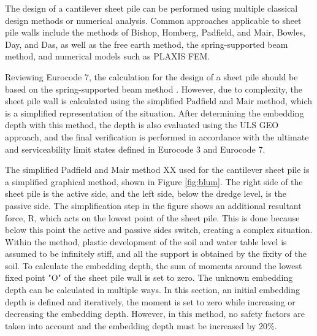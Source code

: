 The design of a cantilever sheet pile can be performed using multiple classical design methods or numerical analysis. Common approaches applicable to sheet pile walls include the methods of Bishop, Homberg, Padfield, and Mair, Bowles, Day, and Das, as well as the free earth method, the spring-supported beam method, and numerical models such as PLAXIS FEM.

Reviewing Eurocode 7, the calculation for the design of a sheet pile should be based on the spring-supported beam method \autocite{stichtingkoninklijknederlandsnormalisatieinstituutNederlandseNormNEN2025}. However, due to complexity, the sheet pile wall is calculated using the simplified Padfield and Mair method, which is a simplified representation of the situation. After determining the embedding depth with this method, the depth is also evaluated using the ULS GEO approach, and the final verification is performed in accordance with the ultimate and serviceability limit states defined in Eurocode 3 and Eurocode 7.

The simplified Padfield and Mair method XX used for the cantilever sheet pile is a simplified graphical method, shown in Figure \ref{fig:blum}. The right side of the sheet pile is the active side, and the left side, below the dredge level, is the passive side. The simplification step in the figure shows an additional resultant force, R, which acts on the lowest point of the sheet pile. This is done because below this point the active and passive sides switch, creating a complex situation. Within the method, plastic development of the soil and water table level is assumed to be infinitely stiff, and all the support is obtained by the fixity of the soil. To calculate the embedding depth, the sum of moments around the lowest fixed point "O" of the sheet pile wall is set to zero. The unknown embedding depth can be calculated in multiple ways. In this section, an initial embedding depth is defined and iteratively, the moment is set to zero while increasing or decreasing the embedding depth. However, in this method, no safety factors are taken into account and the embedding depth must be increased by 20\%.

